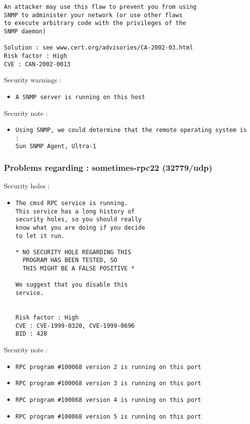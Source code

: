 \documentclass{article}
\begin{document}
\begin{itemize}
\begin{verbatim}
An attacker may use this flaw to prevent you from using
SNMP to administer your network (or use other flaws
to execute arbitrary code with the privileges of the 
SNMP daemon)

Solution : see www.cert.org/advisories/CA-2002-03.html
Risk factor : High
CVE : CAN-2002-0013
\end{verbatim}\end{itemize}
Security warnings :\\
\begin{itemize}
\item \begin{verbatim}
A SNMP server is running on this host
\end{verbatim}\end{itemize}
Security note :\\
\begin{itemize}
\item \begin{verbatim}
Using SNMP, we could determine that the remote operating system is :
Sun SNMP Agent, Ultra-1
\end{verbatim}\end{itemize}
\subsubsection{Problems regarding : sometimes-rpc22 (32779/udp)}
Security holes :\\
\begin{itemize}
\item \begin{verbatim}
The cmsd RPC service is running. 
This service has a long history of 
security holes, so you should really
know what you are doing if you decide
to let it run.

* NO SECURITY HOLE REGARDING THIS
  PROGRAM HAS BEEN TESTED, SO
  THIS MIGHT BE A FALSE POSITIVE *

We suggest that you disable this
service.


Risk factor : High
CVE : CVE-1999-0320, CVE-1999-0696
BID : 428
\end{verbatim}\end{itemize}
Security note :\\
\begin{itemize}
\item \begin{verbatim}
RPC program #100068 version 2 is running on this port
\end{verbatim}\item \begin{verbatim}
RPC program #100068 version 3 is running on this port
\end{verbatim}\item \begin{verbatim}
RPC program #100068 version 4 is running on this port
\end{verbatim}\item \begin{verbatim}
RPC program #100068 version 5 is running on this port
\end{verbatim}\end{itemize}
\end{document}
